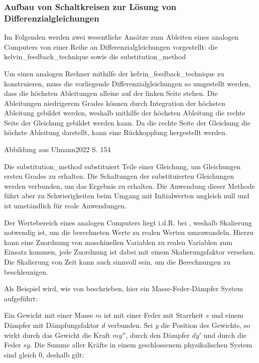 \subsubsection{Aufbau von Schaltkreisen zur Lösung von Differenzialgleichungen}

Im Folgenden werden zwei wesentliche Ansätze zum Ableiten eines analogen Computers von einer Reihe an Differenzialgleichungen vorgestellt: die \gls{kelvin_feedback_technique} sowie die \gls{substitution_method}

Um einen analogen Rechner mithilfe der \gls{kelvin_feedback_technique} zu konstruieren, muss die vorliegende Differenzialgleichungen so umgestellt werden, dass die höchsten Ableitungen alleine auf der linken Seite stehen. Die Ableitungen niedrigerem Grades können durch Integration der höchsten Ableitung gebildet werden, weshalb mithilfe der höchsten Ableitung die rechte Seite der Gleichung gebildet werden kann. Da die rechte Seite der Gleichung die höchste Ableitung darstellt, kann eine Rückkopplung hergestellt werden. \cite[vgl. S. 153 ff.]{Ulmann2022}

Abbildung aus Ulmann2022 S. 154

Die \gls{substitution_method} substituiert Teile einer Gleichung, um Gleichungen ersten Grades zu erhalten. Die Schaltungen der substituierten Gleichungen werden verbunden, um das Ergebnis zu erhalten. Die Anwendung dieser Methode führt aber zu Schwierigkeiten beim Umgang mit Initialwerten ungleich null und ist umständlich für reale Anwendungen. \cite[vgl. S. 155 ff.]{Ulmann2022}

Der Wertebereich eines analogen Computers liegt i.d.R. bei , weshalb Skalierung notwendig ist, um die berechneten Werte zu realen Werten umzuwandeln. Hierzu kann eine Zuordnung von maschinellen Variablen zu realen Variablen zum Einsatz kommen, jede Zuordnung ist dabei mit einem Skalierungsfaktor versehen. Die Skalierung von Zeit kann auch sinnvoll sein, um die Berechnungen zu beschleunigen. \cite[vgl. S. 162 ff.]{Ulmann2022}

Als Beispiel wird, wie von \cite[S. 168 ff.]{Ulmann2022} beschrieben, hier ein Masse-Feder-Dämpfer System aufgeführt:

Ein Gewicht mit einer Masse \(m\) ist mit einer Feder mit Starrheit \(s\) und einem Dämpfer mit Dämpfungsfaktor \(d\) verbunden. Sei \(y\) die Position des Gewichts, so wirkt durch das Gewicht die Kraft \(my''\), durch den Dämpfer \(dy'\) und durch die Feder \(sy\). Die Summe aller Kräfte in einem geschlossenem physikalischen System sind gleich 0, deshalb gilt:


